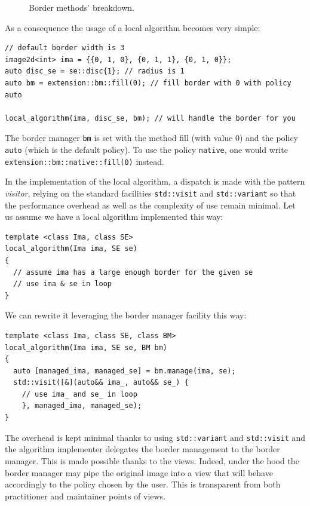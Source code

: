 \begin{figure}[htbp]
  \centering
  \hfil
  \hfil
  \hfil
  \hfil
  \hfil

  \caption{Border methods' breakdown.}
  \label{fig:border.all}
\end{figure}

As a consequence the usage of a local algorithm becomes very simple:

\begin{verbatim}
// default border width is 3
image2d<int> ima = {{0, 1, 0}, {0, 1, 1}, {0, 1, 0}};
auto disc_se = se::disc{1}; // radius is 1
auto bm = extension::bm::fill(0); // fill border with 0 with policy auto

local_algorithm(ima, disc_se, bm); // will handle the border for you
\end{verbatim}

The border manager \texttt{bm} is set with the method fill (with value 0) and the policy \texttt{auto} (which is the
default policy). To use the policy \texttt{native}, one would write \texttt{extension::bm::native::fill(0)} instead.

In the implementation of the local algorithm, a dispatch is made with the pattern \emph{visitor}, relying on the
standard facilities \texttt{std::visit} and \texttt{std::variant} so that the performance overhead as well as the
complexity of use remain minimal. Let us assume we have a local algorithm implemented this way:
\begin{verbatim}
template <class Ima, class SE>
local_algorithm(Ima ima, SE se)
{
  // assume ima has a large enough border for the given se
  // use ima & se in loop
}
\end{verbatim}
We can rewrite it leveraging the border manager facility this way:
\begin{verbatim}
template <class Ima, class SE, class BM>
local_algorithm(Ima ima, SE se, BM bm)
{
  auto [managed_ima, managed_se] = bm.manage(ima, se);
  std::visit([&](auto&& ima_, auto&& se_) {
    // use ima_ and se_ in loop
    }, managed_ima, managed_se);
}
\end{verbatim}
The overhead is kept minimal thanks to using \texttt{std::variant} and \texttt{std::visit} and the algorithm implementer
delegates the border management to the border manager. This is made possible thanks to the views. Indeed, under the hood
the border manager may pipe the original image into a view that will behave accordingly to the policy chosen by the
user. This is transparent from both practitioner and maintainer points of views.



